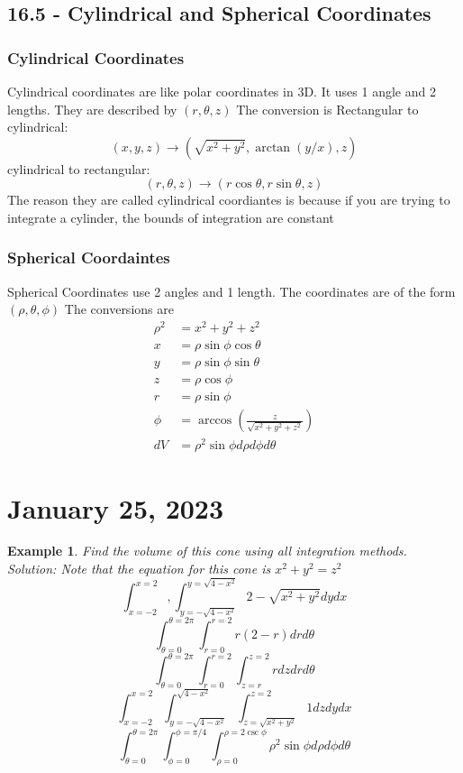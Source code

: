 \documentclass[11pt]{article}
\newtheorem{ex}{Example}
\begin{document}
\subsection{16.5 - Cylindrical and Spherical Coordinates}

\subsubsection{Cylindrical Coordinates}
Cylindrical coordinates are like polar coordinates in 3D. It uses 1 angle and 2 lengths.
They are described by $(r, \theta, z)$
The conversion is
Rectangular to cylindrical:
\[(x,y,z) \to (\sqrt{x^2+y^2}, \arctan(y/x), z)\]
cylindrical to rectangular:
\[(r,\theta, z) \to (r\cos \theta, r\sin \theta, z)\]
The reason they are called cylindrical coordiantes is because if you are trying to integrate a cylinder, the bounds of integration
are constant
\subsubsection{Spherical Coordaintes}
Spherical Coordinates use 2 angles and 1 length. The coordinates are of the form $(\rho, \theta, \phi)$
The conversions are
\begin{align*}
  \rho^2 &= x^2+y^2+z^2\\
  x &= \rho\sin\phi\cos\theta\\
  y &=\rho\sin\phi\sin\theta\\
  z &= \rho\cos\phi\\
  r &=  \rho\sin\phi\\
  \phi &= \arccos(\frac{z}{\sqrt{x^2+y^2+z^2}}) \\
  dV &= \rho^2 \sin\phi d\rho d\phi d\theta
\end{align*}
\section{January 25, 2023}
\begin{ex}
  Find the volume of this cone using all integration methods.
  \\
  Solution:
  Note that the equation for this cone is $x^2+y^2 = z^2$
  \[\int_{x=-2}^{x=2}, \int_{y=-\sqrt{4-x^2}}^{y=\sqrt{4-x^2}} 2-\sqrt{x^2+y^2} dy dx\]
  \[\int_{\theta=0}^{\theta = 2\pi} \int_{r=0}^{r=2} r(2-r) dr d\theta\]
  \[\int_{\theta = 0}^{\theta = 2\pi} \int_{r=0}^{r=2}\int_{z=r}^{z=2} r dz dr d\theta\]
  \[\int_{x=-2}^{x=2} \int_{y=-\sqrt{4-x^2}}^{\sqrt{4-x^2}} \int_{z=\sqrt{x^2+y^2}}^{z=2} 1 dz dy dx\]
  \[\int_{\theta = 0}^{\theta = 2\pi} \int_{\phi =0 }^{\phi = \pi/4} \int_{\rho = 0}^{\rho = 2\csc\phi} \rho^2 \sin\phi d\rho d\phi d\theta\]

\end{ex}
\end{document}
